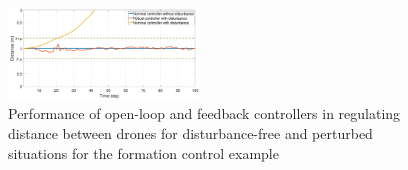 \begin{figure}[t]
	\centering
	\includegraphics[width=0.45\textwidth]{figures/formation_dist2.eps}
	\caption{Performance of open-loop and feedback controllers in regulating distance between drones for disturbance-free and perturbed situations for the formation control example}
	\label{fig:formation_distance}
\end{figure}
 

%









